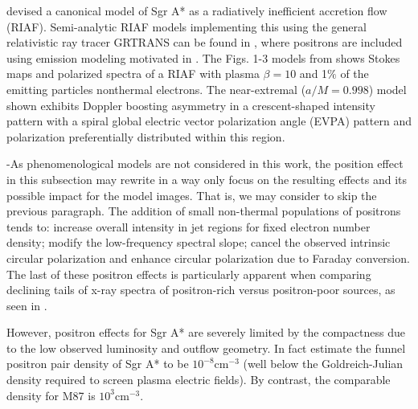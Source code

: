 \cite{2006MNRAS.367..905B} devised a canonical model of Sgr A* as a  radiatively inefficient accretion flow (RIAF). Semi-analytic RIAF models implementing  this using the general relativistic ray tracer GRTRANS \citep{2016MNRAS.462..115D} can be found in  \cite{2021arXiv210105327E}, where  positrons are included using emission modeling motivated in  \cite{2020ApJ...896...30A}. The Figs. 1-3 %
models from \cite{2021arXiv210105327E} shows Stokes maps and polarized spectra of a \cite{2006MNRAS.367..905B} RIAF with plasma $\beta=10$ and 1$\%$ of the emitting particles nonthermal electrons. The near-extremal ($a/M=0.998$) model shown exhibits Doppler boosting asymmetry in a crescent-shaped intensity pattern with a spiral global electric vector polarization angle (EVPA) pattern and polarization preferentially distributed within this region.

\hyp{As phenomenological models are not considered in this work, the position effect in this subsection may rewrite in a way only focus on the resulting effects and its possible impact for the model images. That is, we may consider to skip the previous paragraph.}
The addition of small non-thermal populations of positrons \citep{2020ApJ...896...30A,2021arXiv210105327E} tends to: increase overall intensity in jet regions for fixed electron number density; modify the low-frequency spectral slope; cancel the observed intrinsic circular polarization and enhance circular polarization due to Faraday conversion. The last of these positron effects is particularly apparent when comparing declining tails of x-ray spectra of positron-rich versus positron-poor sources, as seen in \cite{2021arXiv210105327E}.%

However, positron effects for Sgr A* are severely limited by the compactness \citep{2012MNRAS.424L..26G} due to the low observed luminosity and outflow geometry. In fact \cite{2011ApJ...735....9M} estimate the funnel positron pair density of Sgr A* to be $10^{-8}\mathrm{cm}^{-3}$ (well below the Goldreich-Julian density required to screen plasma electric fields). By contrast, the comparable density for M87 is $10^3\mathrm{cm}^{-3}$.





